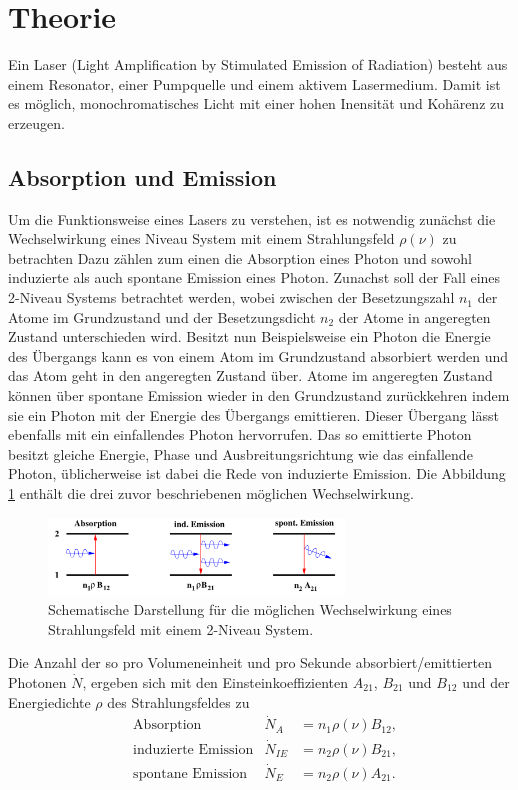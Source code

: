 \section{Theorie}
\label{sec:Theorie}
Ein Laser (Light Amplification by
Stimulated Emission of Radiation)
besteht aus einem Resonator,
einer Pumpquelle und einem aktivem Lasermedium.
Damit ist es möglich, monochromatisches Licht mit einer
hohen Inensität und Kohärenz zu erzeugen.

\subsection{Absorption und Emission}
\label{subsec:absorption_und_emission}
Um die Funktionsweise eines Lasers
zu verstehen, ist es notwendig zunächst
die Wechselwirkung eines Niveau System
mit einem Strahlungsfeld $\rho(\nu)$ zu betrachten
Dazu zählen zum einen die Absorption eines Photon
und sowohl induzierte als auch spontane Emission eines Photon.
Zunachst soll der Fall
eines 2-Niveau Systems betrachtet
werden, wobei zwischen der Besetzungszahl $n_1$
der Atome im Grundzustand
und der Besetzungsdicht $n_2$
der Atome in angeregten
Zustand unterschieden wird.
Besitzt nun Beispielsweise ein
Photon die Energie des Übergangs
kann es von einem Atom im Grundzustand
absorbiert werden und das Atom geht in den
angeregten Zustand über. Atome im angeregten
Zustand können über spontane Emission
wieder in den Grundzustand zurückkehren
indem sie ein Photon mit der Energie
des Übergangs emittieren.
Dieser Übergang lässt ebenfalls
mit ein einfallendes
Photon hervorrufen.
Das so emittierte Photon besitzt gleiche
Energie, Phase und Ausbreitungsrichtung
wie das einfallende Photon,
üblicherweise ist dabei die Rede von
induzierte Emission.
Die Abbildung \ref{fig:ab_em} enthält die drei
zuvor beschriebenen möglichen Wechselwirkung.
\begin{figure}
  \centering
  \includegraphics[width=0.7\textwidth]{figures/ab_und_emiss.PNG}
  \caption{Schematische Darstellung
  für die möglichen Wechselwirkung
   eines Strahlungsfeld
  mit einem 2-Niveau System. \cite{sample}}
  \label{fig:ab_em}
\end{figure}

Die Anzahl der so
pro Volumeneinheit und pro Sekunde
absorbiert/emittierten Photonen $\dot{N}$,
ergeben sich mit den Einsteinkoeffizienten $A_21$, $B_21$ und $B_12$
und der Energiedichte $\rho$ des Strahlungsfeldes zu
\begin{align}
& \text{Absorption}   &\dot{N}_A   &= n_1 \rho(\nu)B_{12},\\
& \text{induzierte Emission}   &\dot{N}_{IE}&= n_2 \rho(\nu)B_{21},\\
& \text{spontane Emission}   &\dot{N}_E   &= n_2 \rho(\nu) A_{21}.
\end{align}

